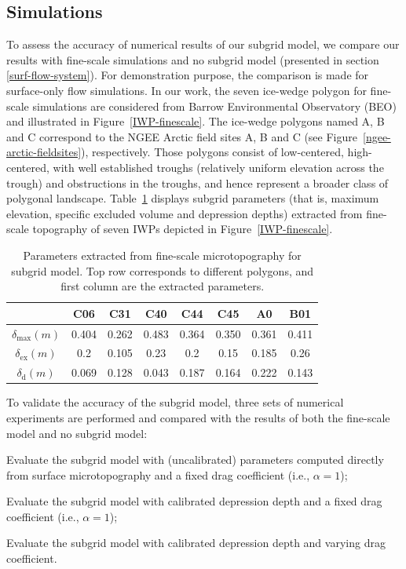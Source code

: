 \documentclass[review,11pt]{elsarticle}
\begin{document}
\subsection{Simulations}
To assess the accuracy of numerical results of our subgrid model, we compare our results with fine-scale simulations and no subgrid model (presented in section \ref{surf-flow-system}). For demonstration purpose, the comparison is made for surface-only flow simulations. In our work, the seven ice-wedge polygon for fine-scale simulations are considered from Barrow Environmental Observatory (BEO) and illustrated in Figure~\ref{IWP-finescale}. The ice-wedge polygons named A, B and C correspond to the NGEE Arctic field sites A, B and C (see Figure~\ref{ngee-arctic-fieldsites}), respectively. Those polygons consist of low-centered, high-centered, with well established troughs (relatively uniform elevation across the trough) and obstructions in the troughs, and hence represent a broader class of polygonal landscape. Table~\ref{subgrid-para} displays subgrid parameters (that is, maximum elevation, specific excluded volume and depression depths) extracted from fine-scale topography of seven IWPs depicted in Figure~\ref{IWP-finescale}.
\begin{center}
\begin{table}[htbp]
\caption{Parameters extracted from fine-scale microtopography for subgrid model. Top row corresponds to different polygons, and first column are the extracted parameters.}\label{subgrid-para}
\begin{tabular}{| c |c|c|c|c|c|c|c|}
\hline
& C06 & C31 & C40 & C44 & C45 & A0 & B01 \\ \hline
 $\delta_\text{max}(m)$ & 0.404 & 0.262 & 0.483 & 0.364 & 0.350 & 0.361 & 0.411 \\ \hline
$\delta_\text{ex}(m)$ & 0.2 & 0.105 & 0.23 & 0.2 & 0.15 & 0.185 & 0.26\\ \hline
$ \delta_\text{d}(m)$ & 0.069 & 0.128 & 0.043 & 0.187 & 0.164 & 0.222 & 0.143 \\ \hline
\end{tabular}

\end{table}
\end{center}

To validate the accuracy of the subgrid model, three sets of numerical experiments are performed and compared with the results of both the fine-scale model and no subgrid model:


\begin{description}\itemsep0pt \parskip0pt
\item [Study I:] Evaluate the subgrid model with (uncalibrated) parameters computed directly from surface microtopography and a fixed drag coefficient (i.e., $\alpha =1$);
\item [Study II:] Evaluate the subgrid model with calibrated depression depth and a fixed drag coefficient (i.e., $\alpha =1$);
\item [Study III:] Evaluate the subgrid model with calibrated depression depth and varying drag coefficient.
\end{description}
\end{document}
